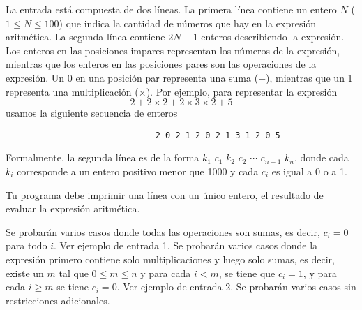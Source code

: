 \documentclass{oci}
\begin{document}
\begin{problemDescription}

\end{problemDescription}

\newpage
\begin{inputDescription}
  La entrada está compuesta de dos líneas.
  La primera línea contiene un entero $N$ ($1\leq N\leq 100$) que indica la
  cantidad de números que hay en la expresión aritmética.
  La segunda línea contiene $2N-1$ enteros describiendo la expresión.
  Los enteros en las posiciones impares representan los números de la expresión,
  mientras que los enteros en las posiciones pares son las operaciones de la
  expresión.
  Un 0 en una posición par representa una suma ($+$), mientras que un 1
  representa una multiplicación ($\times$). 
  Por ejemplo, para representar la expresión
  $$
  2 + 2 \times 2 + 2\times 3 \times 2 + 5
  $$
  usamos la siguiente secuencia de enteros
\begin{verbatim}
                              2 0 2 1 2 0 2 1 3 1 2 0 5
\end{verbatim}

  Formalmente, la segunda línea es de la forma $k_1$ $c_1$ $k_2$ $c_2$ $\cdots$
  $c_{n-1}$ $k_n$, donde cada $k_i$ corresponde a un entero positivo menor que
  1000 y cada $c_i$ es igual a 0 o a 1.
\end{inputDescription}

\begin{outputDescription}
Tu programa debe imprimir una línea con un único entero, el resultado de evaluar la
expresión aritmética.
\end{outputDescription}

\begin{scoreDescription}
   Se probarán varios casos donde todas las operaciones son sumas, es decir,
  $c_i = 0$ para todo $i$.
  Ver ejemplo de entrada 1.
   Se probarán varios casos donde la expresión primero contiene solo
  multiplicaciones y luego solo sumas, es decir, existe un $m$ tal que $0 \leq m \leq n$ y para
  cada $i < m$, se tiene que $c_i = 1$, y para cada $i \geq m$ se tiene $c_i =
  0$.
  Ver ejemplo de entrada 2. 
   Se probarán varios casos sin restricciones adicionales.
\end{scoreDescription}

\begin{sampleDescription}
\end{sampleDescription}
\end{document}
